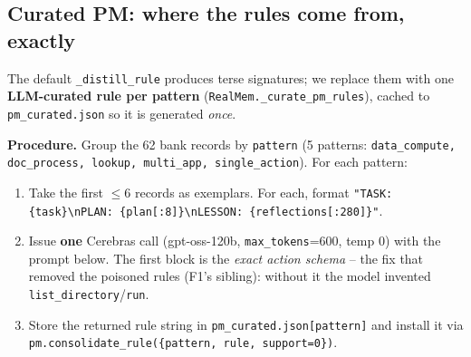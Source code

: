 \subsection{Curated PM: where the rules come from, exactly}
\label{sec:gl-pm}
The default \texttt{\_distill\_rule} produces terse signatures; we replace them with one
\textbf{LLM-curated rule per pattern} (\texttt{RealMem.\_curate\_pm\_rules}), cached to
\texttt{pm\_curated.json} so it is generated \emph{once}.

\noindent\textbf{Procedure.} Group the 62 bank records by \texttt{pattern} (5 patterns:
\texttt{data\_compute, doc\_process, lookup, multi\_app, single\_action}). For each pattern:
\begin{enumerate}\itemsep1pt
\item Take the first $\le 6$ records as exemplars. For each, format
\texttt{"TASK: \{task\}\textbackslash nPLAN: \{plan[:8]\}\textbackslash nLESSON:
\{reflections[:280]\}"}.
\item Issue \textbf{one} Cerebras call (gpt-oss-120b, \texttt{max\_tokens}=600, temp 0) with the prompt
below. The first block is the \emph{exact action schema} -- the fix that removed the poisoned rules
(F1's sibling): without it the model invented \texttt{list\_directory}/\texttt{run}.
\item Store the returned rule string in \texttt{pm\_curated.json[pattern]} and install it via
\texttt{pm.consolidate\_rule(\{pattern, rule, support=0\})}.
\end{enumerate}

